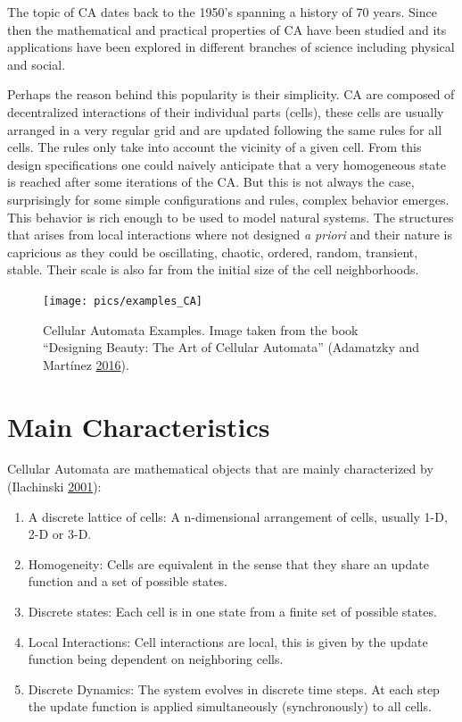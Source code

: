 \documentclass[
]{book}
\begin{document}
The topic of CA dates back to the 1950's spanning a history of 70 years. Since then the mathematical and practical properties of CA have been studied and its applications have been explored in different branches of science including physical and social.

Perhaps the reason behind this popularity is their simplicity. CA are composed of decentralized interactions of their individual parts (cells), these cells are usually arranged in a very regular grid and are updated following the same rules for all cells. The rules only take into account the vicinity of a given cell. From this design specifications one could naively anticipate that a very homogeneous state is reached after some iterations of the CA. But this is not always the case, surprisingly for some simple configurations and rules, complex behavior emerges. This behavior is rich enough to be used to model natural systems. The structures that arises from local interactions where not designed \emph{a priori} and their nature is capricious as they could be oscillating, chaotic, ordered, random, transient, stable. Their scale is also far from the initial size of the cell neighborhoods.



\begin{figure}

{\centering \texttt{[image: pics/examples\_CA]} 

}

\caption{Cellular Automata Examples. Image taken from the book ``Designing Beauty: The Art of Cellular Automata'' (Adamatzky and Martínez \protect\hyperlink{ref-adamatzky2016designing}{2016}).}\label{fig:CA-examples}
\end{figure}

\hypertarget{main-characteristics}{%
\section{Main Characteristics}\label{main-characteristics}}

Cellular Automata are mathematical objects that are mainly characterized by (Ilachinski \protect\hyperlink{ref-ilachinski2001cellular}{2001}):

\begin{enumerate}
\def\labelenumi{\arabic{enumi}.}
\item
  A discrete lattice of cells:
  A n-dimensional arrangement of cells, usually 1-D, 2-D or 3-D.
\item
  Homogeneity:
  Cells are equivalent in the sense that they share an update function and a set of possible states.
\item
  Discrete states:
  Each cell is in one state from a finite set of possible states.
\item
  Local Interactions:
  Cell interactions are local, this is given by the update function being dependent on neighboring cells.
\item
  Discrete Dynamics:
  The system evolves in discrete time steps. At each step the update function is applied simultaneously (synchronously) to all cells.
\end{enumerate}
\end{document}

